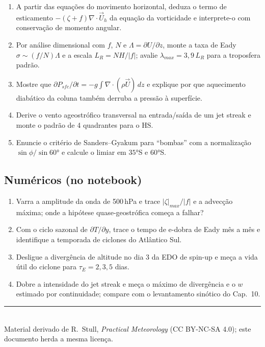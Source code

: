 \documentclass[11pt]{article}
\begin{document}
\begin{enumerate}[label=\textbf{T\arabic*.},itemsep=4pt]
  \item A partir das equações do movimento horizontal, deduza o termo
        de esticamento $-(\zeta+f)\nabla\cdot\vec U_h$ da equação da
        vorticidade e interprete-o com conservação de momento angular.
  \item Por análise dimensional com $f$, $N$ e
        $\Lambda = \partial U/\partial z$, monte a taxa de Eady
        $\sigma \sim (f/N)\Lambda$ e a escala
        $L_R = NH/|f|$; avalie $\lambda_{max} = 3{,}9\,L_R$ para a
        troposfera padrão.
  \item Mostre que $\partial P_{sfc}/\partial t =
        -g\int\nabla\cdot(\rho\vec U)\,dz$ e explique por que
        aquecimento diabático da coluna também derruba a pressão à
        superfície.
  \item Derive o vento ageostrófico transversal na entrada/saída de um
        jet streak e monte o padrão de 4 quadrantes para o HS.
  \item Enuncie o critério de Sanders--Gyakum para ``bombas'' com a
        normalização $\sin\phi/\sin 60°$ e calcule o limiar em
        $35°$S e $60°$S.
\end{enumerate}

\subsection*{Numéricos (no notebook)}

\begin{enumerate}[label=\textbf{N\arabic*.},itemsep=4pt]
  \item Varra a amplitude da onda de 500\,hPa e trace $|\zeta|_{max}/|f|$
        e a advecção máxima; onde a hipótese quase-geostrófica começa a
        falhar?
  \item Com o ciclo sazonal de $\partial T/\partial y$, trace o tempo
        de e-dobra de Eady mês a mês e identifique a temporada de
        ciclones do Atlântico Sul.
  \item Desligue a divergência de altitude no dia 3 da EDO de spin-up e
        meça a vida útil do ciclone para $\tau_E = 2, 3, 5$ dias.
  \item Dobre a intensidade do jet streak e meça o máximo de
        divergência e o $w$ estimado por continuidade; compare com o
        levantamento sinótico do Cap.~10.
\end{enumerate}

\vspace{1em}
\noindent\rule{\linewidth}{0.4pt}\\
{\scriptsize Material derivado de R.~Stull, \emph{Practical Meteorology}
(CC BY-NC-SA 4.0); este documento herda a mesma licença.}
\end{document}
